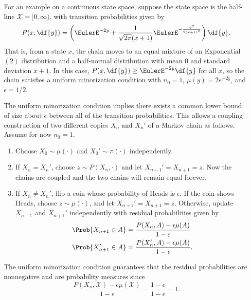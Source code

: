 \documentclass[12pt]{article}
\begin{document}
\begin{example}
    For an example on a continuous state space, suppose the state space
    is the half-line \( \mathcal{X} = [0, \infty) \), with transition
    probabilities given by
    \[
        P(x, \df{y}) = \left( \EulerE^{-2y} + \frac{1}{\sqrt{2\pi}(x+1)}
        \EulerE^{-\frac{y^2}{2(x+1)^2}} \right) \df{y}.
    \] That is, from a state \( x \), the chain moves to an equal
    mixture of an Exponential\( (2) \) distribution and a half-normal
    distribution with mean \( 0 \) and standard deviation \( x + 1 \).
    In this case, \( P(x, \df{y}) \ge \EulerE^{-2y} \df{y} \) for all \(
    x \), so the chain satisfies a uniform minorization condition with \(
    n_0 = 1 \), \( \mu(y) = 2e^{-2y} \), and \( \epsilon = 1/2 \).
\end{example}

The uniform minorization condition implies there exists a common lower
bound of size about \( \epsilon \) between all of the transition
probabilities.  This allows a coupling construction of two different
copies \( X_n \) and \( X_n' \) of a Markov chain as follows.  Assume
for now \( n_0 = 1 \).
\begin{enumerate}
    \item
        Choose \( X_0 \sim \mu(\cdot) \) and \( X_0' \sim \pi(\cdot) \)
        independently.
    \item
        If \( X_n = X_n' \), choose \( z \sim P(X_n, \cdot) \) and let \(
        X_{n+1}' = X_{n+1} = z \).  Now the chains are coupled and the
        two chains will remain equal forever.
    \item
        If \( X_n \ne X_n' \), flip a coin whose probability of Heads is
        \( \epsilon \).  If the coin shows Heads, choose \( z \sim \mu(\cdot)
        \), and let \( X_{n+1}' = X_{n+1} = z \).  Otherwise, update \(
        X_{n+1} \) and \( X_{n+1}' \) independently with residual
        probabilities given by
        \begin{align*}
            \Prob{X_{n+1} \in A} &= \frac{P(X_n, A) - \epsilon \mu(A)}{1-\epsilon}
            \\
            \Prob{X_{n+1}' \in A} &= \frac{P(X_n', A) - \epsilon \mu(A)}
            {1-\epsilon}.  \\
        \end{align*}
\end{enumerate}

The uniform minorization condition guarantees that the residual
probabilities are nonnegative and are probability measures since
\[
    \frac{P(X_n, \mathcal{X}) - \epsilon \mu(\mathcal{X})}{1-\epsilon} =
    \frac{1-\epsilon}{1-\epsilon} = 1.
\]
\end{document}
